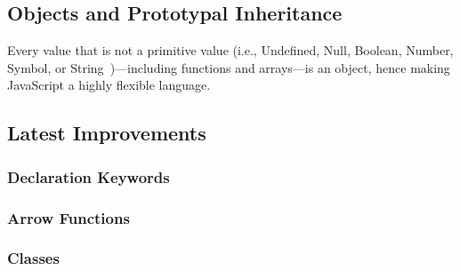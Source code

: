 






\subsection{Objects and Prototypal Inheritance}
\label{sec:objects-prototypal-inheritance}

Every value that is not a primitive value (i.e., Undefined, Null, Boolean, Number, Symbol, or String~\cite[p.~5]{ES2015Spec:Ecma:2015})---including functions and arrays---is an object, hence making JavaScript a highly flexible language.

\subsection{Latest Improvements}
\label{sec:latest-improvements}

\subsubsection{Declaration Keywords}

\subsubsection{Arrow Functions}

\subsubsection{Classes}

